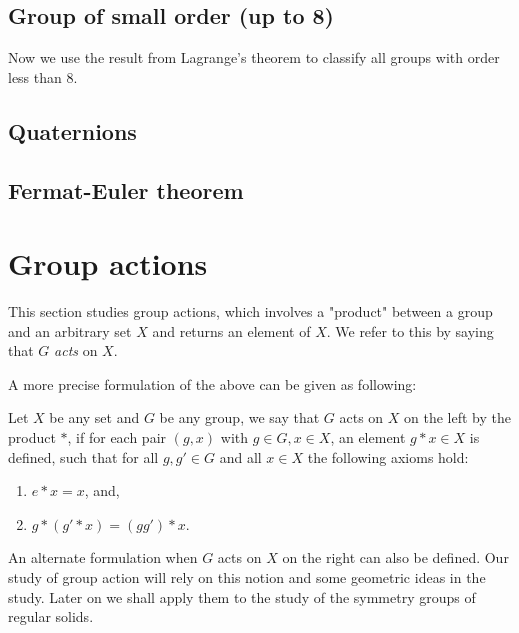 \documentclass[main.tex]{subfiles}
\begin{document}
			\subsection{Group of small order (up to 8)}
				Now we use the result from Lagrange's theorem to classify all groups with order less than 8.
			\subsection{Quaternions}
			
			\subsection{Fermat-Euler theorem}
			
		\section{Group actions}
		This section studies group actions, which involves a "product" between a group and an arbitrary set $X$ and returns an element of $X$. We refer to this by saying that $G$ \textit{acts} on $X$. 
		
		A more precise formulation of the above can be given as following:
		\begin{definition}
			Let $X$ be any set and $G$ be any group, we say that $G$ acts on $X$ on the left by the product $\ast$, if for each pair $(g, x)$ with $g \in G, x \in X$, an element $g\ast x \in X$ is defined, such that for all $g, g' \in G$ and all $x \in X$ the following axioms hold:
			\begin{enumerate}
				\item $e\ast x = x$, and,
				\item $g \ast (g' \ast x) = (g g')\ast x$.
			\end{enumerate}
		\end{definition}
		An alternate formulation when $G$ acts on $X$ on the right can also be defined. Our study of group action will rely on this notion and some geometric ideas in the study. Later on we shall apply them to the study of the symmetry groups of regular solids.
			
\end{document}
